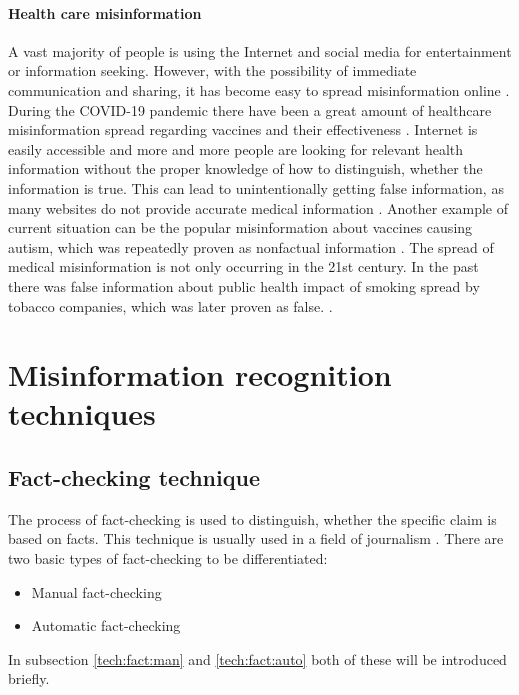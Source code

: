 \documentclass[11pt ,english,a4paper]{article}
\begin{document}

\paragraph{Health care misinformation}
A vast majority of people is using the Internet and social media for entertainment or information seeking. However, with the possibility of immediate communication and sharing, it has become easy to spread misinformation online \cite{wa19sys}. During the COVID-19 pandemic there have been a great amount of healthcare misinformation spread regarding vaccines and their effectiveness \cite{chap22unmask}. Internet is easily accessible and more and more people are looking for relevant health information without the proper knowledge of how to distinguish, whether the information is true. This can lead to unintentionally getting false information, as many websites do not provide accurate medical information \cite{cook15misinfo}. Another example of current situation can be the popular misinformation about vaccines causing autism, which was repeatedly proven as nonfactual information \cite{wa19sys}. 
The spread of medical misinformation is not only occurring in the 21st century. In the past there was false information about public health impact of smoking spread by tobacco companies, which was later proven as false. \cite{cook15misinfo}.



\section{Misinformation recognition techniques} \label{tech}

\subsection{Fact-checking technique} \label{tech:fact}
The process of fact-checking is used to distinguish, whether the specific claim is based on facts. This technique is usually used in a field of journalism \cite{alh18fact}.
There are two basic types of fact-checking to be differentiated:\cite{vla14fact} 
\begin{itemize}
\item Manual fact-checking
\item Automatic fact-checking
\end{itemize}
In subsection \ref{tech:fact:man} and \ref{tech:fact:auto} both of these will be introduced briefly.
\end{document}
